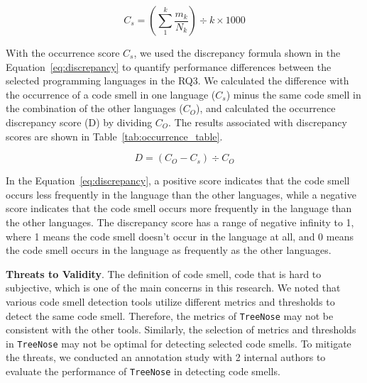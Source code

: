 
\begin{equation}
C_{s} = \left( \sum_{1}^{k}{\frac{m_{k}}{N_{k}}} \right) \div k \times 1000
\label{eq:prevalence}
\end{equation}


With the occurrence score $C_{s}$, we used the discrepancy formula shown in
the Equation~\ref{eq:discrepancy} to quantify performance differences between
the selected programming languages in the RQ3. We calculated the difference with
the occurrence of a code smell in one language ($C_{s}$) minus the same code
smell in the combination of the other languages ($C_{O}$), and calculated the
occurrence discrepancy score (D) by dividing $C_{O}$. The results associated
with discrepancy scores are shown in Table~\ref{tab:occurrence_table}.


\begin{equation}
    D = (C_{O} - C_{s}) \div C_{O}
    \label{eq:discrepancy}
\end{equation}

In the Equation~\ref{eq:discrepancy}, a positive score indicates that the code
smell occurs less frequently in the language than the other languages, while a
negative score indicates that the code smell occurs more frequently in the
language than the other languages. The discrepancy score has a range of
negative infinity to 1, where 1 means the code smell doesn't occur in the
language at all, and 0 means the code smell occurs in the language as
frequently as the other languages.

{\bf Threats to Validity}. The definition of code smell, code that is hard to
subjective, which is one of the main concerns in this research.
We noted that various code smell detection tools
utilize different metrics and thresholds to detect the same code smell.
Therefore, the metrics of \texttt{TreeNose} may not be consistent with the
other tools. Similarly, the selection of metrics and thresholds in
\texttt{TreeNose} may not be optimal for detecting selected code smells. To
mitigate the threats, we conducted an annotation study with 2 internal authors to
evaluate the performance of \texttt{TreeNose} in detecting code smells.

